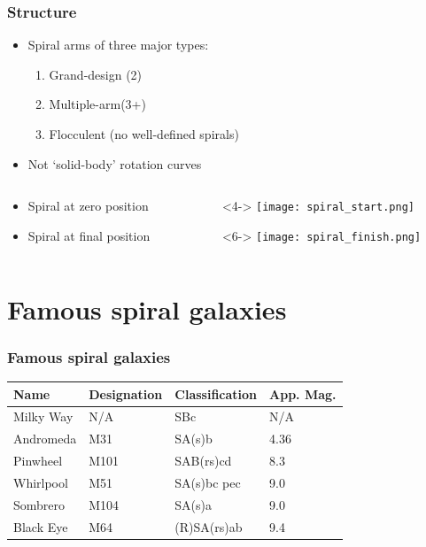 \documentclass{beamer}
\begin{document}
\begin{frame}[t]
\frametitle{Structure}
	\begin{itemize}
	\item<1->Spiral arms of three major types:
		\begin{enumerate}
		\item<1->Grand-design (2)
		\item<1->Multiple-arm(3+)
		\item<1->Flocculent (no well-defined spirals)
		\end{enumerate}
	\item<2->Not `solid-body' rotation curves \cite{mihos2011}
	\end{itemize}

\begin{columns}
  \begin{column}{0.5\textwidth}
    \begin{itemize}
        \item<3->Spiral at zero position
	\bigskip
	\bigskip
	\bigskip
        \item<5->Spiral at final position
    \end{itemize}
  \end{column}

  \begin{column}{0.5\textwidth}
     \begin{itemize}
        	\item[]<4-> \texttt{[image: spiral\_start.png]}
	\item[]<6-> \texttt{[image: spiral\_finish.png]}
     \end{itemize}
  \end{column}
\end{columns}
\end{frame}

\section{Famous spiral galaxies}

\begin{frame}[t]
\frametitle{Famous spiral galaxies}
\begin{center}
\begin{tabular}{|l l l l|} \hline	
Name		&	Designation	&	Classification	&	App. Mag.  			\\ \hline
Milky Way		&	N/A 			&	SBc			&	N/A 				\\
Andromeda	&	M31			&	SA(s)b  		&	4.36				\\
Pinwheel		& 	M101		&	SAB(rs)cd		& 	8.3				\\
Whirlpool		&	M51			&	SA(s)bc pec	&	9.0				\\
Sombrero 		& 	M104		& 	SA(s)a 		&	9.0				\\			 
Black Eye		&	M64			&	(R)SA(rs)ab	&	9.4				\\ \hline
\end{tabular}
\end{center}
\end{frame}
\end{document}
